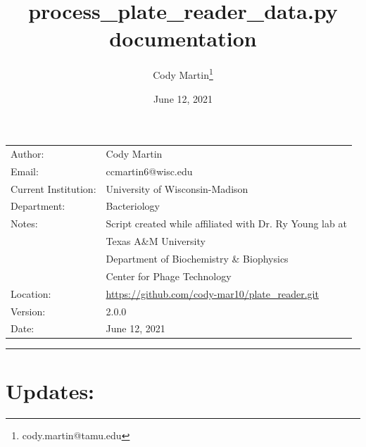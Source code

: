 \documentclass[12pt]{article}
\author{Cody Martin\thanks{cody.martin@tamu.edu}}
\date{June 12, 2021}
\title{process\_plate\_reader\_data.py documentation}
\begin{document}
\maketitle
\begin{center}
\begin{xltabular}{\textwidth}{lX}
\hline
Author: & Cody Martin\\
Email: & ccmartin6@wisc.edu\\
\hline
Current Institution: & University of Wisconsin-Madison\\
Department: & Bacteriology\\
\hline
Notes: & Script created while affiliated with Dr. Ry Young lab at\\
 & Texas A\&M University\\
 & Department of Biochemistry \& Biophysics\\
 & Center for Phage Technology\\
\hline
Location: & \url{https://github.com/cody-mar10/plate\_reader.git}\\
Version: & 2.0.0\\
Date: & June 12, 2021\\
\end{xltabular}
\end{center}

\noindent\rule{\textwidth}{0.5pt}
\section*{Updates:}
\label{sec:org0cb34f4}
\end{document}
